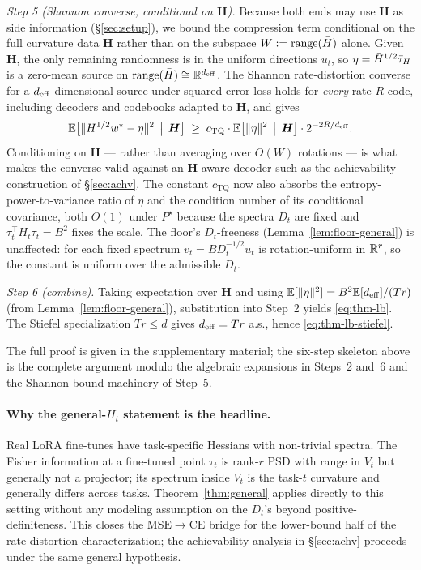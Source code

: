 \emph{Step 5 (Shannon converse, conditional on $\boldsymbol H$).}
Because both ends may use $\boldsymbol H$ as side information
(\S\ref{sec:setup}), we bound the compression term conditional on
the full curvature data $\boldsymbol H$ rather than on the
subspace $W := \operatorname{range}(\bar H)$ alone. Given $\boldsymbol H$, the
only remaining randomness is in the uniform directions $u_t$, so
$\eta = \bar H^{1/2}\bar{\tau}_H$ is a zero-mean source on
$\operatorname{range}(\bar H)\cong\mathbb{R}^{d_{\mathrm{eff}}}$. The Shannon rate-distortion
converse for a $d_{\mathrm{eff}}$-dimensional source under squared-error loss
holds for \emph{every} rate-$R$ code, including decoders and
codebooks adapted to $\boldsymbol H$, and gives
\begin{equation*}
  \mathbb{E}\bigl[\|\bar H^{1/2}w^\star-\eta\|^2\,\bigm|\,\boldsymbol H\bigr]
  \;\geq\;
  c_{\mathrm{TQ}}\cdot\mathbb{E}\bigl[\|\eta\|^2\,\bigm|\,\boldsymbol H\bigr]\cdot
  2^{-2R/d_{\mathrm{eff}}}.
\end{equation*}
Conditioning on $\boldsymbol H$ — rather than averaging over
$O(W)$ rotations — is what makes the converse valid against an
$\boldsymbol H$-aware decoder such as the achievability
construction of \S\ref{sec:achv}. The constant $c_{\mathrm{TQ}}$
now also absorbs the entropy-power-to-variance ratio of $\eta$ and
the condition number of its conditional covariance, both $O(1)$
under $P^\star$ because the spectra $D_t$ are fixed and
$\tau_t^\top H_t\tau_t = B^2$ fixes the scale. The floor's
$D_t$-freeness (Lemma~\ref{lem:floor-general}) is unaffected: for
each fixed spectrum $v_t = B D_t^{-1/2} u_t$ is rotation-uniform
in $\mathbb{R}^r$, so the constant is uniform over the admissible $D_t$.

\emph{Step 6 (combine).} Taking expectation over $\boldsymbol H$ and using
$\mathbb{E}[\|\eta\|^2] = B^2\mathbb{E}[d_{\mathrm{eff}}]/(Tr)$ (from
Lemma~\ref{lem:floor-general}), substitution into Step~2 yields
\eqref{eq:thm-lb}. The Stiefel specialization $Tr\leq d$ gives
$d_{\mathrm{eff}} = Tr$ a.s., hence \eqref{eq:thm-lb-stiefel}.

The full proof is given in the supplementary material; the
six-step skeleton above is the complete argument modulo the
algebraic expansions in Steps~2 and~6 and the Shannon-bound
machinery of Step~5.

\paragraph{Why the general-$H_t$ statement is the headline.}
Real LoRA fine-tunes have task-specific Hessians with
non-trivial spectra. The Fisher information at a fine-tuned
point $\tau_t$ is rank-$r$ PSD with range in $V_t$ but generally
not a projector; its spectrum inside $V_t$ is the task-$t$
curvature and generally differs across tasks.
Theorem~\ref{thm:general} applies directly to this setting
without any modeling assumption on the $D_t$'s beyond
positive-definiteness. This closes the $\mathrm{MSE}\to
\mathrm{CE}$ bridge for the lower-bound half of the
rate-distortion characterization; the achievability analysis in
\S\ref{sec:achv} proceeds under the same general hypothesis.
